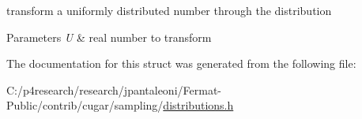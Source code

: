 transform a uniformly distributed number through the distribution


\begin{DoxyParams}{Parameters}
{\em U} & real number to transform \\
\hline
\end{DoxyParams}


The documentation for this struct was generated from the following file\+:\begin{DoxyCompactItemize}
\item 
C\+:/p4research/research/jpantaleoni/\+Fermat-\/\+Public/contrib/cugar/sampling/\hyperlink{distributions_8h}{distributions.\+h}\end{DoxyCompactItemize}
